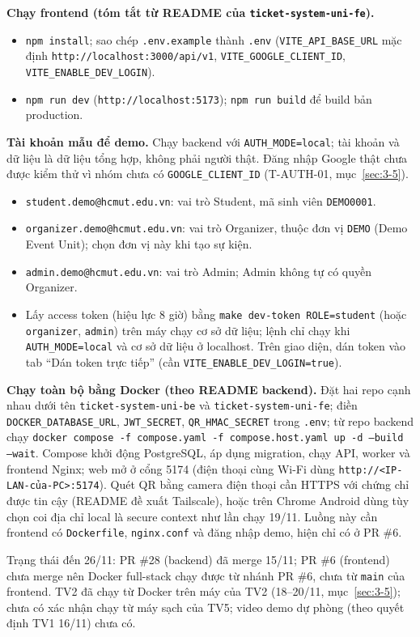 \textbf{Chạy frontend (tóm tắt từ README của \texttt{ticket-system-uni-fe}).}
\begin{itemize}
  \item \texttt{npm install}; sao chép \texttt{.env.example} thành \texttt{.env} (\texttt{VITE\_API\_BASE\_URL} mặc định \texttt{http://localhost:3000/api/v1}, \texttt{VITE\_GOOGLE\_CLIENT\_ID}, \texttt{VITE\_ENABLE\_DEV\_LOGIN}).
  \item \texttt{npm run dev} (\texttt{http://localhost:5173}); \texttt{npm run build} để build bản production.
\end{itemize}

\textbf{Tài khoản mẫu để demo.} Chạy backend với \texttt{AUTH\_MODE=local}; tài khoản và dữ liệu là dữ liệu tổng hợp, không phải người thật. Đăng nhập Google thật chưa được kiểm thử vì nhóm chưa có \texttt{GOOGLE\_CLIENT\_ID} (T-AUTH-01, mục~\ref{sec:3-5}).
\begin{itemize}
  \item \texttt{student.demo@hcmut.edu.vn}: vai trò Student, mã sinh viên \texttt{DEMO0001}.
  \item \texttt{organizer.demo@hcmut.edu.vn}: vai trò Organizer, thuộc đơn vị \texttt{DEMO} (Demo Event Unit); chọn đơn vị này khi tạo sự kiện.
  \item \texttt{admin.demo@hcmut.edu.vn}: vai trò Admin; Admin không tự có quyền Organizer.
  \item Lấy access token (hiệu lực 8 giờ) bằng \texttt{make dev-token ROLE=student} (hoặc \texttt{organizer}, \texttt{admin}) trên máy chạy cơ sở dữ liệu; lệnh chỉ chạy khi \texttt{AUTH\_MODE=local} và cơ sở dữ liệu ở localhost. Trên giao diện, dán token vào tab \enquote{Dán token trực tiếp} (cần \texttt{VITE\_ENABLE\_DEV\_LOGIN=true}).
\end{itemize}

\textbf{Chạy toàn bộ bằng Docker (theo README backend).} Đặt hai repo cạnh nhau dưới tên \texttt{ticket-system-uni-be} và \texttt{ticket-system-uni-fe}; điền \texttt{DOCKER\_DATABASE\_URL}, \texttt{JWT\_SECRET}, \texttt{QR\_HMAC\_SECRET} trong \texttt{.env}; từ repo backend chạy \texttt{docker compose -f compose.yaml -f compose.host.yaml up -d --build --wait}. Compose khởi động PostgreSQL, áp dụng migration, chạy API, worker và frontend Nginx; web mở ở cổng 5174 (điện thoại cùng Wi-Fi dùng \texttt{http://<IP-LAN-của-PC>:5174}). Quét QR bằng camera điện thoại cần HTTPS với chứng chỉ được tin cậy (README đề xuất Tailscale), hoặc trên Chrome Android dùng tùy chọn coi địa chỉ local là secure context như lần chạy 19/11. Luồng này cần frontend có \texttt{Dockerfile}, \texttt{nginx.conf} và đăng nhập demo, hiện chỉ có ở PR \#6.

Trạng thái đến 26/11: PR \#28 (backend) đã merge 15/11; PR \#6 (frontend) chưa merge nên Docker full-stack chạy được từ nhánh PR \#6, chưa từ \texttt{main} của frontend. TV2 đã chạy từ Docker trên máy của TV2 (18--20/11, mục~\ref{sec:3-5}); chưa có xác nhận chạy từ máy sạch của TV5; video demo dự phòng (theo quyết định TV1 16/11) chưa có.
